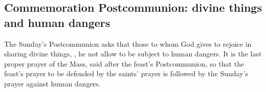 \subsection{Commemoration Postcommunion: divine things and human dangers}
\label{sec:element-commemoration-postcommunion}

The Sunday's Postcommunion asks that those to whom God gives to rejoice in
sharing divine things, , he not allow to
be subject to human dangers. It is the last proper prayer of the Mass, said
after the feast's Postcommunion, so that the feast's prayer to be defended by
the saints' prayer is followed by the Sunday's prayer against human dangers.
